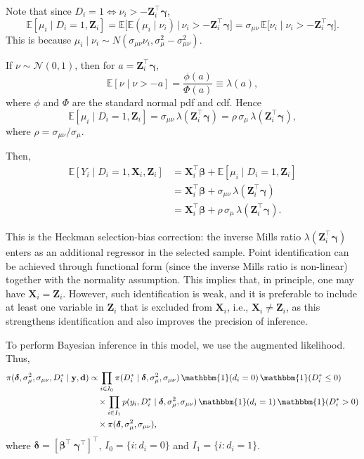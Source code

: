 Note that since \(D_i=1 \iff \nu_i>-\mathbf Z_i^\top\boldsymbol\gamma\),
\[
\mathbb E[\mu_i\mid D_i=1,\mathbf Z_i]
=\mathbb E\!\big[\mathbb E(\mu_i\mid \nu_i)\,\big|\,\nu_i>-\mathbf Z_i^\top\boldsymbol\gamma\big]
=\sigma_{\mu\nu}\,\mathbb E\!\big[\nu_i\mid \nu_i>-\mathbf Z_i^\top\boldsymbol\gamma\big].
\] This is because $\mu_i\mid \nu_i\sim N(\sigma_{\mu\nu}\nu_i, \sigma^2_{\mu}-\sigma_{\mu\nu}^2)$.

If \(\nu\sim\mathcal N(0,1)\), then for \(a=\mathbf Z_i^\top\boldsymbol\gamma\),
\[
\mathbb E[\nu\mid \nu>-a]=\frac{\phi(a)}{\Phi(a)}\equiv \lambda(a),
\]
where \(\phi\) and \(\Phi\) are the standard normal pdf and cdf. Hence
\[
\mathbb E[\mu_i\mid D_i=1,\mathbf Z_i]=\sigma_{\mu\nu}\,\lambda(\mathbf Z_i^\top\boldsymbol\gamma)
	=\rho\,\sigma_\mu\,\lambda(\mathbf Z_i^\top\boldsymbol\gamma),
\]
where $\rho=\sigma_{\mu\nu}/\sigma_{\mu}$.

Then, 
\begin{align*}
	\mathbb E[Y_i\mid D_i=1,\mathbf X_i,\mathbf Z_i]
	&=\mathbf X_i^\top \boldsymbol\beta+\mathbb E[\mu_i\mid D_i=1,\mathbf Z_i]\\
	&=\mathbf X_i^\top \boldsymbol\beta + \sigma_{\mu\nu}\,\lambda(\mathbf Z_i^\top\boldsymbol\gamma)\\
	&=\mathbf X_i^\top \boldsymbol\beta + \rho\,\sigma_\mu\,\lambda(\mathbf Z_i^\top\boldsymbol\gamma).
\end{align*}

This is the Heckman selection-bias correction: the inverse Mills ratio \(\lambda(\mathbf Z_i^\top\boldsymbol\gamma)\) enters as an additional regressor in the selected sample.
Point identification can be achieved through functional form (since the inverse Mills ratio is non-linear) together with the normality assumption. This implies that, in principle, one may have $\mathbf{X}_i=\mathbf{Z}_i$. However, such identification is weak, and it is preferable to include at least one variable in $\mathbf{Z}_i$ that is excluded from $\mathbf{X}_i$, i.e., $\mathbf{X}_i\neq\mathbf{Z}_i$, as this strengthens identification and also improves the precision of inference.

To perform Bayesian inference in this model, we use the augmented likelihood. Thus,
\begin{align*}
	\pi(\boldsymbol{\delta},\sigma^2_{\mu},\sigma_{\mu\nu},D_i^*\mid \mathbf{y},\mathbf{d}) 
	& \propto \prod_{i\in I_{0}} \pi(D_i^*\mid \boldsymbol{\delta},\sigma^2_{\mu},\sigma_{\mu\nu}) 
	\, \mathbbm{1}(d_i=0)\, \mathbbm{1}(D_i^*\leq 0) \\
	& \quad \times \prod_{i\in I_{1}} p(y_i,D_i^*\mid \boldsymbol{\delta},\sigma^2_{\mu},\sigma_{\mu\nu}) 
	\, \mathbbm{1}(d_i=1)\, \mathbbm{1}(D_i^*> 0) \\
	& \quad \times \pi(\boldsymbol{\delta},\sigma^2_{\mu},\sigma_{\mu\nu}),
\end{align*}
where $\boldsymbol{\delta}=[\boldsymbol{\beta}^{\top} \ \boldsymbol{\gamma}^{\top}]^{\top}$, 
$I_0=\{i : d_i=0\}$ and $I_1=\{i : d_i=1\}$.

